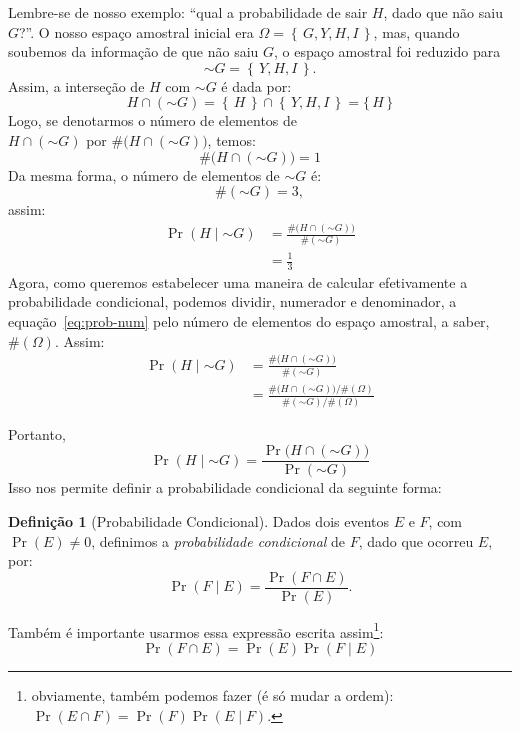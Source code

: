 \documentclass[12pt]{article}
\theoremstyle{definition}
\newtheorem{definicao}{Definição}
\newcommand{\N}{\ensuremath{\sim\!}}
\begin{document}
		Lembre-se de nosso exemplo: ``qual a probabilidade de sair $H$, dado que não
		saiu $G$?''. 
		O nosso espaço amostral inicial era $\Omega = \left\{\, G, Y, H, I\,\right\}$,
		mas, quando soubemos da informação de que não saiu $G$, o espaço amostral
		foi reduzido para
		\[
		 \N G = \left\{\, Y, H, I\,\right\}.
		\]
		Assim, a interseção de $H$ com $\N G$ é dada por:
  \[ 
			H \cap (\N G) = \left\{\, H \,\right\} \cap \left\{\, Y, H, I\,\right\}
				             = \{\, H \,\}
		\]
		Logo, se denotarmos o número de elementos de\\ $ H \cap (\N G)$ por
		$\#\big( H \cap (\N G) \big)$, temos:
		\[
		 \#\big( H \cap (\N G) \big) = 1
		\] 
		Da mesma forma, o número de elementos de $\N G$ é:
		\[
		 \# (\N G) = 3,
		\]
		assim:
		\begin{align}
		 \Pr{\left( H \mid \N G\right)} 
			&= 
			\frac{\#\big( H \cap (\N G) \big)}{\# (\N G)}\label{eq:prob-num}\\
			&= 
			\frac{1}{3} \nonumber
		\end{align}
		Agora, como queremos estabelecer uma maneira de calcular efetivamente a 
		probabilidade condicional, podemos dividir, numerador e denominador, a 
		equação~\ref{eq:prob-num} pelo número de elementos do espaço amostral, a 
		saber, $ \# (\Omega) $. 
		Assim:
		\begin{align*}
		 \Pr{\left( H \mid \N G\right)} 
			&= 
			\frac{\#\big( H \cap (\N G) \big)}{\# (\N G)}\label{eq:prob-num}\\
			&=
			\frac
			{
			 \#\big( H \cap (\N G) \big) / \# (\Omega)
			}
			{
			 \# (\N G) / \# (\Omega)
			}
		\end{align*}
		
		Portanto,
		\[
			\Pr{(H \mid \N G)} = \frac{\Pr{\big(H \cap (\N G)\big)}}{\Pr{(\N G)}}
		\]
	 Isso nos permite definir a probabilidade condicional da seguinte forma:
		
		\begin{definicao}[Probabilidade Condicional]\label{eq:prob-condicional}
		 Dados dois eventos $ E $ e $ F $, com $ \Pr{(E)} \neq 0 $, definimos a 
			\textit{probabilidade condicional} de $ F $, dado que ocorreu $E$, por:
				\[
				 \Pr{(F \mid E)} = \frac{\Pr{\left(F \cap E\right)}}{\Pr{(E)}}.
				\]
		\end{definicao}
		
		Também é importante usarmos essa expressão escrita assim\footnote{obviamente,
		também podemos fazer (é só mudar a ordem): $\Pr{(E \cap F)} = \Pr{(F)}
		\Pr{(E \mid F)}$.}:
		\begin{equation}\label{eq:prop-inter}
		 \Pr{\left(F \cap E\right)} = \Pr{(E)}\Pr{(F \mid E)}
		\end{equation}
	
\end{document}
